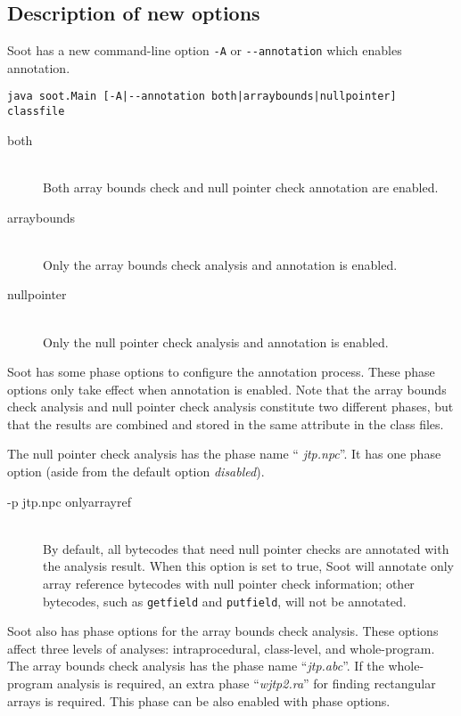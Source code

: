 \documentclass{article}
\begin{document}
\subsection{Description of new options}

Soot has a new command-line option {\tt-A} or {\tt-}{\tt-annotation} 
which enables annotation.

\begin{verbatim}
java soot.Main [-A|--annotation both|arraybounds|nullpointer] classfile
\end{verbatim}

\begin{description}
\item[both]\ \\
  Both array bounds check and null pointer check annotation are enabled.
\item[arraybounds]\ \\
  Only the array bounds check analysis and annotation is enabled.
\item[nullpointer]\ \\
  Only the null pointer check analysis and annotation is enabled.
\end{description}

Soot has some phase options to configure the annotation process.
These phase options only take effect when annotation is enabled.  
Note that the array bounds check analysis and null pointer
check analysis constitute two different phases, but that the results
are combined and stored in the same attribute in the class files. 

The null pointer check analysis has the phase name ``{\em
jtp.npc}''. It has one phase option (aside from the default option
{\em disabled}).

\begin{description}

\item[-p jtp.npc onlyarrayref]\ \\
  By default, all bytecodes that need null pointer checks are 
  annotated with the analysis result. When this option is set to true, 
  Soot will annotate only array reference bytecodes with null 
  pointer check information; other bytecodes, such as {\tt getfield} 
  and {\tt putfield}, will not be annotated. 
\end{description}

Soot also has phase options for the array bounds check analysis.
These options affect three levels of analyses: intraprocedural,
class-level, and whole-program. The array bounds check analysis has
the phase name ``{\em jtp.abc}''.  If the whole-program analysis is
required, an extra phase ``{\em wjtp2.ra}'' for finding rectangular
arrays is required.  This phase can be also enabled with
phase options.
\end{document}
